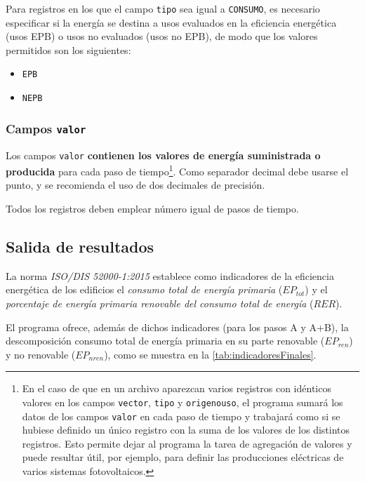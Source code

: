 \documentclass[10pt,notitlepage,oneside,a4paper]{article}
\begin{document}
Para registros en los que el campo \texttt{tipo} sea igual a \texttt{CONSUMO}, es necesario especificar si la energía se destina a usos evaluados en la eficiencia energética (usos EPB) o usos no evaluados (usos no EPB), de modo que los valores permitidos son los siguientes:

\begin{itemize}
\item \texttt{EPB}
\item \texttt{NEPB}
\end{itemize}

\subsubsection{Campos \texttt{valor}}

Los campos \texttt{valor} \textbf{contienen los valores de energía suministrada o producida} para cada paso de tiempo\footnote{En el caso de que en un archivo aparezcan varios registros con idénticos valores en los campos \texttt{vector}, \texttt{tipo} y \texttt{origenouso}, el programa sumará los datos de los campos \texttt{valor} en cada paso de tiempo y trabajará como si se hubiese definido un único registro con la suma de los valores de los distintos registros. Esto permite dejar al programa la tarea de agregación de valores y puede resultar útil, por ejemplo, para definir las producciones eléctricas de varios sistemas fotovoltaicos.}. Como separador decimal debe usarse el punto, y se recomienda el uso de dos decimales de precisión.

Todos los registros deben emplear número igual de pasos de tiempo.

\subsection{Salida de resultados}

La norma \textit{ISO/DIS 52000-1:2015} establece como indicadores de la eficiencia energética de los edificios el \textit{consumo total de energía primaria} (\texttt{$EP_{tot}$}) y el \textit{porcentaje de energía primaria renovable del consumo total de energía} (\texttt{$RER$}).

El programa ofrece, además de dichos indicadores (para los pasos A y A+B), la descomposición consumo total de energía primaria en su parte renovable (\texttt{$EP_{ren}$}) y no renovable (\texttt{$EP_{nren}$}), como se muestra en la \autoref{tab:indicadoresFinales}.
\end{document}
